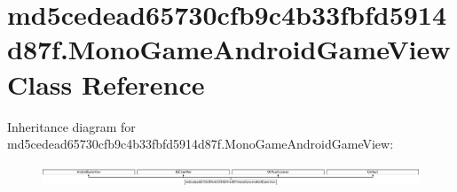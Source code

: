 \hypertarget{classmd5cedead65730cfb9c4b33fbfd5914d87f_1_1MonoGameAndroidGameView}{}\section{md5cedead65730cfb9c4b33fbfd5914d87f.\+Mono\+Game\+Android\+Game\+View Class Reference}
\label{classmd5cedead65730cfb9c4b33fbfd5914d87f_1_1MonoGameAndroidGameView}
Inheritance diagram for md5cedead65730cfb9c4b33fbfd5914d87f.\+Mono\+Game\+Android\+Game\+View\+:\begin{figure}[H]
\begin{center}
\leavevmode
\includegraphics[height=0.654206cm]{classmd5cedead65730cfb9c4b33fbfd5914d87f_1_1MonoGameAndroidGameView}
\end{center}
\end{figure}
